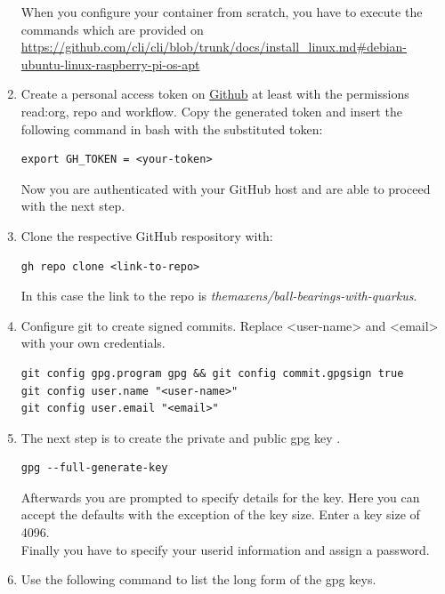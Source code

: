 \begin{enumerate}
        When you configure your container from scratch, you have to execute the commands which are provided on \url{https://github.com/cli/cli/blob/trunk/docs/install_linux.md#debian-ubuntu-linux-raspberry-pi-os-apt}
        \item Create a personal access token on \href{https://github.com/settings/tokens}{Github} at least with the permissions read:org, repo and workflow. Copy the generated token and insert the following command in \ac{bash} with the substituted token: 
            \begin{lstlisting}[style=bash]
export GH_TOKEN = <your-token>
            \end{lstlisting}   
        Now you are authenticated with your GitHub host and are able to proceed with the next step.
        \item Clone the respective GitHub respository with: 
            \begin{lstlisting}[style=bash] 
gh repo clone <link-to-repo>  
            \end{lstlisting} 
            In this case the link to the repo is \textit{themaxens/ball-bearings-with-quarkus}.
        \item Configure git to create signed commits. Replace <user-name> and <email> with your own credentials. 
            \begin{lstlisting}[style=bash] 
git config gpg.program gpg && git config commit.gpgsign true
git config user.name "<user-name>"
git config user.email "<email>"
            \end{lstlisting}
        \item The next step is to create the private and public \ac{gpg} key \autocite[vgl.][]{create_gpg}.
            \begin{lstlisting}[style=bash] 
gpg --full-generate-key 
            \end{lstlisting} 
        Afterwards you are prompted to specify details for the key. Here you can accept the defaults with the exception of the key size. Enter a key size of 4096. \\
        Finally you have to specify your userid information and assign a password. 
        \item \label{itm:gpg_key_start} Use the following command to list the long form of the \ac{gpg} keys. 

\end{enumerate}
